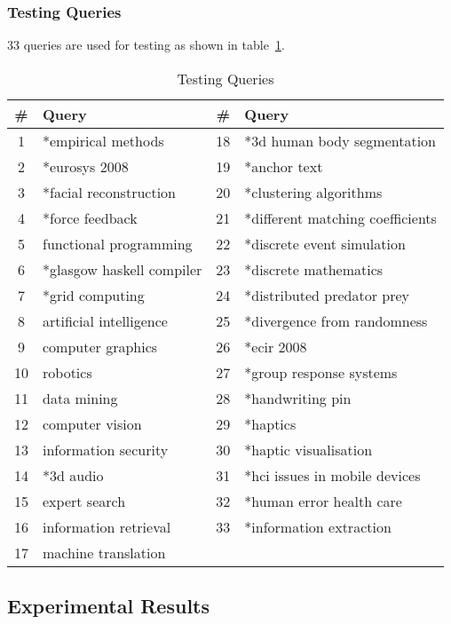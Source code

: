 \subsubsection{Testing Queries}
33 queries are used for testing as shown in table~\ref{table:testingqueries}.
\begin{table}
\centering
\begin{tabular}{|c|l|c|l|}
\hline \textbf{\#} & \textbf{Query} & \textbf{\#} & \textbf{Query} \\
\hline 1 & *empirical methods & 18 & *3d human body segmentation\\
\hline 2 & *eurosys 2008 & 19 & *anchor text \\
\hline 3  & *facial reconstruction & 20 & *clustering algorithms\\ 
\hline 4  & *force feedback & 21 & *different matching coefficients\\ 
\hline 5  & functional programming & 22 & *discrete event simulation\\ 
\hline 6  & *glasgow haskell compiler & 23 & *discrete mathematics\\ 
\hline 7  & *grid computing & 24 & *distributed predator prey\\ 
\hline 8  & artificial intelligence & 25 & *divergence from randomness\\ 
\hline 9  & computer graphics & 26 & *ecir 2008 \\
\hline 10  & robotics & 27 & *group response systems\\ 
\hline 11  & data mining & 28 & *handwriting pin\\ 
\hline 12  & computer vision & 29 & *haptics\\ 
\hline 13  & information security & 30 & *haptic visualisation\\ 
\hline 14  & *3d audio & 31 & *hci issues in mobile devices\\ 
\hline 15  & expert search & 32 & *human error health care \\ 
\hline 16  & information retrieval & 33 & *information extraction\\ 
\hline 17  & machine translation &  & \\ 
\hline
\end{tabular}
\caption{Testing Queries} \label{table:testingqueries}
\end{table}

\subsection{Experimental Results}

